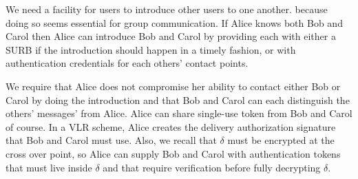
We need a facility for users to introduce other users to one another.
because doing so seems essential for group communication.  If Alice 
knows both Bob and Carol then Alice can introduce Bob and Carol by
providing each with either a SURB if the introduction should happen
in a timely fashion, or with authentication credentials for each
others' contact points.  

We require that Alice does not compromise her ability to contact
either Bob or Carol by doing the introduction and that Bob and Carol
can each distinguish the others' messages' from Alice. 
Alice can share single-use token from Bob and Carol of course.
In a VLR scheme, Alice creates the delivery authorization signature
that Bob and Carol must use.
Also, we recall that $\delta$ must be encrypted at the cross over
point, so Alice can supply Bob and Carol with authentication tokens 
that must live inside $\delta$ and that require verification before
fully decrypting $\delta$.  

 


